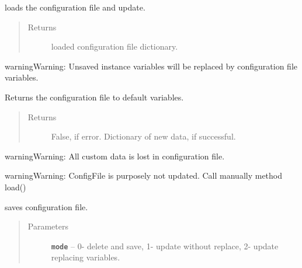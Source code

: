 \documentclass[letterpaper,10pt,english]{sphinxmanual}
\begin{document}
\begin{fulllineitems}

\begin{fulllineitems}
\label{RRtoolbox.lib:RRtoolbox.lib.config.directoryManager.load}
loads the configuration file and update.
\begin{quote}\begin{description}
\item[{Returns}] \leavevmode
loaded configuration file dictionary.

\end{description}\end{quote}

\begin{notice}{warning}{Warning:}
Unsaved instance variables will be replaced by configuration file variables.
\end{notice}

\end{fulllineitems}


\begin{fulllineitems}
\label{RRtoolbox.lib:RRtoolbox.lib.config.directoryManager.reset}
Returns the configuration file to default variables.
\begin{quote}\begin{description}
\item[{Returns}] \leavevmode
False, if error. Dictionary of new data, if successful.

\end{description}\end{quote}

\begin{notice}{warning}{Warning:}
All custom data is lost in configuration file.
\end{notice}

\begin{notice}{warning}{Warning:}
ConfigFile is purposely not updated. Call manually method load()
\end{notice}

\end{fulllineitems}


\begin{fulllineitems}
\label{RRtoolbox.lib:RRtoolbox.lib.config.directoryManager.save}
saves configuration file.
\begin{quote}\begin{description}
\item[{Parameters}] \leavevmode
\textbf{\texttt{mode}} -- 0- delete and save, 1- update without replace,
2- update replacing variables.


\end{description}
\end{quote}
\end{fulllineitems}
\end{fulllineitems}
\end{document}
